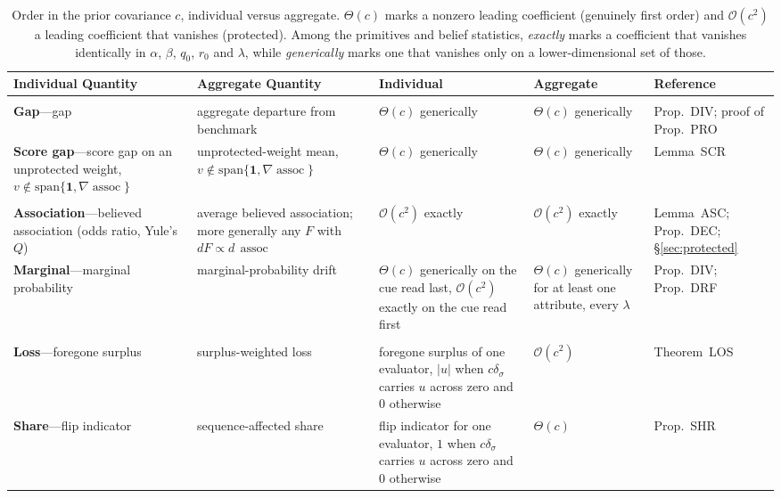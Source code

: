 \documentclass[a4paper,fleqn]{cas-sc}
\theoremstyle{remark}
\theoremstyle{definition}
\newcommand{\assoc}{\operatorname{assoc}}
\newcommand{\bigO}{\mathcal{O}}
\begin{document}
\begin{table}
\centering
\small
\begin{tabular}{@{}>{\raggedright\arraybackslash}p{4.6cm}>{\raggedright\arraybackslash}p{4.6cm}>{\raggedright\arraybackslash}p{4.7cm}>{\raggedright\arraybackslash}p{4.2cm}>{\raggedright\arraybackslash}p{2.9cm}@{}}
\toprule
\textbf{Individual Quantity} & \textbf{Aggregate Quantity} & \textbf{Individual} & \textbf{Aggregate} & \textbf{Reference}\\
\midrule
\multicolumn{5}{@{}l}{\emph{Primitives}}\\
\midrule
\textbf{Gap}---gap & aggregate departure from benchmark & $\Theta(c)$ generically & $\Theta(c)$ generically & Prop.~DIV; proof of Prop.~PRO\\
\textbf{Score gap}---score gap on an unprotected weight, $v\notin\mathrm{span}\{\mathbf{1},\nabla\assoc\}$ & unprotected-weight mean, $v\notin\mathrm{span}\{\mathbf{1},\nabla\assoc\}$ & $\Theta(c)$ generically & $\Theta(c)$ generically & Lemma~SCR\\
\midrule
\multicolumn{5}{@{}l}{\emph{Belief statistics}}\\
\midrule
\textbf{Association}---believed association (odds ratio, Yule's $Q$) & average believed association; more generally any $F$ with $dF\propto d\,\assoc$ & $\bigO(c^{2})$ exactly & $\bigO(c^{2})$ exactly & Lemma~ASC; Prop.~DEC; \S\ref{sec:protected}\\
\textbf{Marginal}---marginal probability & marginal-probability drift & $\Theta(c)$ generically on the cue read last, $\bigO(c^{2})$ exactly on the cue read first & $\Theta(c)$ generically for at least one attribute, every $\lambda$ & Prop.~DIV; Prop.~DRF\\
\midrule
\multicolumn{5}{@{}l}{\emph{Decision statistics}}\\
\midrule
\textbf{Loss}---foregone surplus & surplus-weighted loss & foregone surplus of one evaluator, $|u|$ when $c\delta_\sigma$ carries $u$ across zero and $0$ otherwise & $\bigO(c^{2})$ & Theorem~LOS\\
\textbf{Share}---flip indicator & sequence-affected share & flip indicator for one evaluator, $1$ when $c\delta_\sigma$ carries $u$ across zero and $0$ otherwise & $\Theta(c)$ & Prop.~SHR\\
\bottomrule
\end{tabular}
\caption{Order in the prior covariance $c$, individual versus aggregate. $\Theta(c)$ marks a
nonzero leading coefficient (genuinely first order) and $\bigO(c^{2})$ a leading coefficient
that vanishes (protected). Among the primitives and belief statistics, \emph{exactly} marks a coefficient that
vanishes identically in $\alpha$, $\beta$, $q_{0}$, $r_{0}$ and $\lambda$, while
\emph{generically} marks one that vanishes only on a lower-dimensional set of those.}
\label{tab:order-summary}
\end{table}
\end{document}

